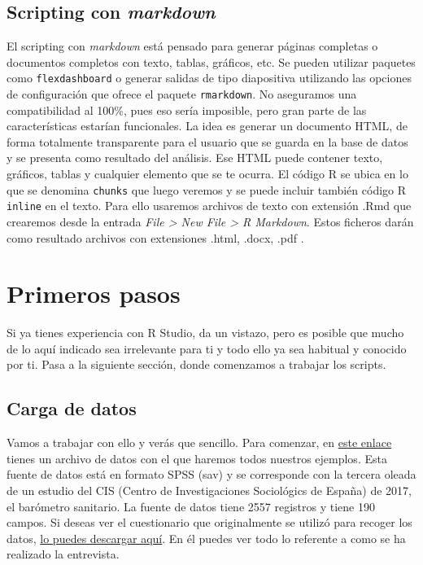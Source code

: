 \documentclass[
]{book}
\begin{document}
\hypertarget{scripting-con-markdown}{%
\subsection{\texorpdfstring{Scripting con \emph{markdown}}{Scripting con markdown}}\label{scripting-con-markdown}}

El scripting con \emph{markdown} está pensado para generar páginas completas o documentos completos con texto, tablas, gráficos, etc. Se pueden utilizar paquetes como \texttt{flexdashboard} o generar salidas de tipo diapositiva utilizando las opciones de configuración que ofrece el paquete \texttt{rmarkdown}. No aseguramos una compatibilidad al 100\%, pues eso sería imposible, pero gran parte de las características estarían funcionales. La idea es generar un documento HTML, de forma totalmente transparente para el usuario que se guarda en la base de datos y se presenta como resultado del análisis. Ese HTML puede contener texto, gráficos, tablas y cualquier elemento que se te ocurra. El código R se ubica en lo que se denomina \texttt{chunks} que luego veremos y se puede incluir también código R \texttt{inline} en el texto. Para ello usaremos archivos de texto con extensión .Rmd que crearemos desde la entrada \emph{File \textgreater{} New File \textgreater{} R Markdown}. Estos ficheros darán como resultado archivos con extensiones .html, .docx, .pdf .

\hypertarget{primeros-pasos}{%
\section{Primeros pasos}\label{primeros-pasos}}

Si ya tienes experiencia con R Studio, da un vistazo, pero es posible que mucho de lo aquí indicado sea irrelevante para ti y todo ello ya sea habitual y conocido por ti. Pasa a la siguiente sección, donde comenzamos a trabajar los scripts.

\hypertarget{carga-de-datos}{%
\subsection{Carga de datos}\label{carga-de-datos}}

Vamos a trabajar con ello y verás que sencillo. Para comenzar, en \href{https://drive.google.com/a/investigaonline.com/file/d/1JjevbQjzGc1NMyR7qf7bbvtbMyK8Pvhr/view?usp=drive_web}{este enlace} tienes un archivo de datos con el que haremos todos nuestros ejemplos. Esta fuente de datos está en formato SPSS (sav) y se corresponde con la tercera oleada de un estudio del CIS (Centro de Investigaciones Sociológics de España) de 2017, el barómetro sanitario.
La fuente de datos tiene 2557 registros y tiene 190 campos. Si deseas ver el cuestionario que originalmente se utilizó para recoger los datos, \href{https://drive.google.com/a/investigaonline.com/file/d/1AUUI-1isOmKB1ovR4MRoqMj2Fp7Re2f2/view?usp=drive_web}{lo puedes descargar aquí}. En él puedes ver todo lo referente a como se ha realizado la entrevista.
\end{document}
